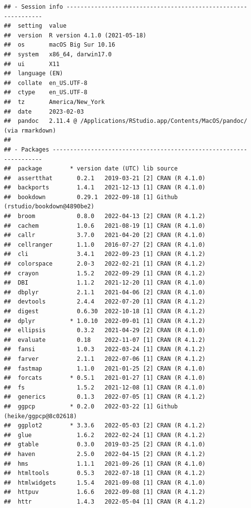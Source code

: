 \documentclass[print]{nuthesis}
\begin{document}
\begin{verbatim}
## - Session info ---------------------------------------------------------------
##  setting  value
##  version  R version 4.1.0 (2021-05-18)
##  os       macOS Big Sur 10.16
##  system   x86_64, darwin17.0
##  ui       X11
##  language (EN)
##  collate  en_US.UTF-8
##  ctype    en_US.UTF-8
##  tz       America/New_York
##  date     2023-02-03
##  pandoc   2.11.4 @ /Applications/RStudio.app/Contents/MacOS/pandoc/ (via rmarkdown)
## 
## - Packages -------------------------------------------------------------------
##  package        * version date (UTC) lib source
##  assertthat       0.2.1   2019-03-21 [2] CRAN (R 4.1.0)
##  backports        1.4.1   2021-12-13 [1] CRAN (R 4.1.0)
##  bookdown         0.29.1  2022-09-18 [1] Github (rstudio/bookdown@4890be2)
##  broom            0.8.0   2022-04-13 [2] CRAN (R 4.1.2)
##  cachem           1.0.6   2021-08-19 [1] CRAN (R 4.1.0)
##  callr            3.7.0   2021-04-20 [2] CRAN (R 4.1.0)
##  cellranger       1.1.0   2016-07-27 [2] CRAN (R 4.1.0)
##  cli              3.4.1   2022-09-23 [1] CRAN (R 4.1.2)
##  colorspace       2.0-3   2022-02-21 [1] CRAN (R 4.1.2)
##  crayon           1.5.2   2022-09-29 [1] CRAN (R 4.1.2)
##  DBI              1.1.2   2021-12-20 [1] CRAN (R 4.1.0)
##  dbplyr           2.1.1   2021-04-06 [2] CRAN (R 4.1.0)
##  devtools         2.4.4   2022-07-20 [1] CRAN (R 4.1.2)
##  digest           0.6.30  2022-10-18 [1] CRAN (R 4.1.2)
##  dplyr          * 1.0.10  2022-09-01 [1] CRAN (R 4.1.2)
##  ellipsis         0.3.2   2021-04-29 [2] CRAN (R 4.1.0)
##  evaluate         0.18    2022-11-07 [1] CRAN (R 4.1.2)
##  fansi            1.0.3   2022-03-24 [1] CRAN (R 4.1.2)
##  farver           2.1.1   2022-07-06 [1] CRAN (R 4.1.2)
##  fastmap          1.1.0   2021-01-25 [2] CRAN (R 4.1.0)
##  forcats        * 0.5.1   2021-01-27 [1] CRAN (R 4.1.0)
##  fs               1.5.2   2021-12-08 [1] CRAN (R 4.1.0)
##  generics         0.1.3   2022-07-05 [1] CRAN (R 4.1.2)
##  ggpcp          * 0.2.0   2022-03-22 [1] Github (heike/ggpcp@8c02618)
##  ggplot2        * 3.3.6   2022-05-03 [2] CRAN (R 4.1.2)
##  glue             1.6.2   2022-02-24 [1] CRAN (R 4.1.2)
##  gtable           0.3.0   2019-03-25 [2] CRAN (R 4.1.0)
##  haven            2.5.0   2022-04-15 [2] CRAN (R 4.1.2)
##  hms              1.1.1   2021-09-26 [1] CRAN (R 4.1.0)
##  htmltools        0.5.3   2022-07-18 [1] CRAN (R 4.1.2)
##  htmlwidgets      1.5.4   2021-09-08 [1] CRAN (R 4.1.0)
##  httpuv           1.6.6   2022-09-08 [1] CRAN (R 4.1.2)
##  httr             1.4.3   2022-05-04 [1] CRAN (R 4.1.2)

\end{verbatim}
\end{document}
